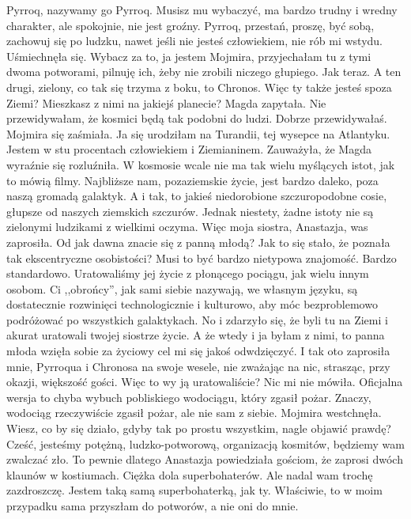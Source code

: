 \begin{dialogue}
\ds{} Pyrroq, nazywamy go Pyrroq. Musisz mu wybaczyć, ma bardzo trudny i wredny charakter, ale spokojnie, nie jest groźny. 
Pyrroq, przestań, proszę, być sobą, zachowuj się po ludzku, nawet jeśli nie jesteś człowiekiem, nie rób mi wstydu.
\dm{} Uśmiechnęła się. \dm{}
Wybacz za to, ja jestem Mojmira, przyjechałam tu z tymi dwoma potworami, pilnuję ich, żeby nie zrobili niczego głupiego. Jak teraz. 
A ten drugi, zielony, co tak się trzyma z boku, to Chronos.
\ds{} Więc ty także jesteś spoza Ziemi? Mieszkasz z nimi na jakiejś planecie? \dm{} Magda zapytała. \dm{} Nie przewidywałam, że kosmici będą tak podobni do ludzi.
\ds{} Dobrze przewidywałaś. \dm{} Mojmira się zaśmiała. \dm{} Ja się urodziłam na Turandii, tej wysepce na Atlantyku. Jestem w stu procentach człowiekiem i Ziemianinem.
\dm{} Zauważyła, że Magda wyraźnie się rozluźniła. \dm{} W kosmosie wcale nie ma tak wielu myślących istot, jak to mówią filmy. 
Najbliższe nam, pozaziemskie życie, jest bardzo daleko, poza naszą gromadą galaktyk. 
A i tak, to jakieś niedorobione szczuropodobne cosie, głupsze od naszych ziemskich szczurów.
Jednak niestety, żadne istoty nie są zielonymi ludzikami z wielkimi oczyma.
\ds{} Więc moja siostra, Anastazja, was zaprosiła. Od jak dawna znacie się z panną młodą? 
Jak to się stało, że poznała tak ekscentryczne osobistości? Musi to być bardzo nietypowa znajomość.
\ds{} Bardzo standardowo. Uratowaliśmy jej życie z płonącego pociągu, jak wielu innym osobom. 
Ci ,,obrońcy'', jak sami siebie nazywają, we własnym języku, są dostatecznie rozwinięci technologicznie i kulturowo, 
aby móc bezproblemowo podróżować po wszystkich galaktykach.
No i zdarzyło się, że byli tu na Ziemi i akurat uratowali twojej siostrze życie.
A że wtedy i ja byłam z nimi, to panna młoda wzięła sobie za życiowy cel mi się jakoś odwdzięczyć. 
I tak oto zaprosiła mnie, Pyrroqua i Chronosa na swoje wesele, nie zważając na nic, strasząc, przy okazji, większość gości.
\ds{} Więc to wy ją uratowaliście? Nic mi nie mówiła.
\ds{} Oficjalna wersja to chyba wybuch pobliskiego wodociągu, który zgasił pożar. 
Znaczy, wodociąg rzeczywiście zgasił pożar, ale nie sam z siebie.
\dm{} Mojmira westchnęła. \dm{}
Wiesz, co by się działo, gdyby tak po prostu wszystkim, nagle objawić prawdę?
Cześć, jesteśmy potężną, ludzko-potworową, organizacją kosmitów, będziemy wam zwalczać zło.
\ds{} To pewnie dlatego Anastazja powiedziała gościom, że zaprosi dwóch klaunów w kostiumach. Ciężka dola superbohaterów. Ale nadal wam trochę zazdroszczę.
\ds{} Jestem taką samą superbohaterką, jak ty. Właściwie, to w moim przypadku sama przyszłam do potworów, a nie oni do mnie.

\end{dialogue}

